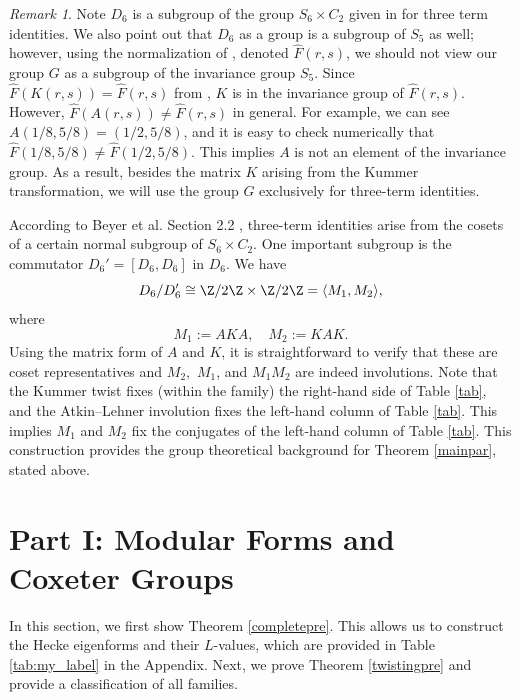 \documentclass[12pt]{amsart}
\theoremstyle{definition}
\theoremstyle{remark}
\newtheorem{remark}{Remark}
\begin{document}
\begin{remark}
    Note $D_6$ is a subgroup of the group $S_6\times C_2$ given in \cite{coxeter} for three term identities. We also point out that $D_6$ as a group is a subgroup of $S_5$ as well; however, using the normalization of \cite{coxeter}, denoted $\hat{F}(r,s)$, we should not view our group $G$ as a subgroup of the invariance group $S_5$. Since $\hat{F}(K(r,s))=\hat{F}(r,s)$ from \cite{coxeter}, $K$ is in the invariance group of $\hat{F}(r,s)$. However, $\hat{F}(A(r,s))\neq \hat{F}(r,s)$ in general. For example, we can see $A(1/8,5/8)=(1/2,5/8)$, and it is easy to check numerically that $\hat{F}(1/8,5/8)\neq\hat{F}(1/2,5/8)$. This implies $A$ is not an element of the invariance group. As a result, besides the matrix $K$ arising from the Kummer transformation, we will use the group $G$ exclusively for three-term identities.
\end{remark} 

According to Beyer et al. Section 2.2 \cite{coxeter}, three-term identities arise from the cosets of a certain normal subgroup of $S_6\times C_2$.  One important subgroup is the commutator $D_6'=[D_6,D_6]$ in $D_6$. We have $$D_6/D_6'\cong \Z/2\Z\times \Z/2\Z=\langle M_1,M_2 \rangle,$$ where \begin{equation}\label{eq:M&N}
     M_1:=AKA, \quad M_2:=KAK.
 \end{equation} Using the matrix form of $A$ and $K$, it is straightforward to verify that these are coset representatives and $M_2,$ $M_1$, and $M_1M_2$ are indeed involutions. Note that the Kummer twist fixes (within the family) the right-hand side of Table \ref{tab}, and the Atkin--Lehner involution fixes the left-hand column of Table \ref{tab}.  This implies $M_1$ and $M_2$ fix the conjugates of the left-hand column of Table \ref{tab}. This construction provides the group theoretical background for Theorem \ref{mainpar}, stated above.







\section{Part I: Modular Forms and Coxeter Groups}\label{modcox}
In this section, we first show Theorem \ref{completepre}. This allows us to construct the Hecke eigenforms and their $L$-values, which are provided in Table \ref{tab:my_label} in the Appendix. Next, we prove Theorem \ref{twistingpre} and provide a classification of all families.
\end{document}
